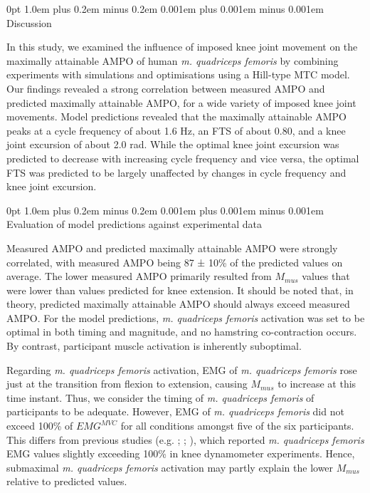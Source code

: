 \documentclass[
  11pt,
  a4paper]{article}
\makeatletter
\renewcommand{\section}{%
  \@startsection{section}{1}
    {0pt} 					%
    {1.0em plus 0.2em minus 0.2em} 	%
    {0.001em plus 0.001em minus 0.001em}    	%
    {\Large\bfseries\sffamily}%
}
\renewcommand{\subsection}{%
  \@startsection{subsection}{2}
    {0pt} 					%
    {1.0em plus 0.2em minus 0.2em} 	%
    {0.001em plus 0.001em minus 0.001em}    	%
    {\large\bfseries\sffamily}%
}
\makeatother
\begin{document}
\section{Discussion}\label{discussion}

In this study, we examined the influence of imposed knee joint movement
on the maximally attainable AMPO of human \emph{m. quadriceps femoris}
by combining experiments with simulations and optimisations using a
Hill-type MTC model. Our findings revealed a strong correlation between
measured AMPO and predicted maximally attainable AMPO, for a wide
variety of imposed knee joint movements. Model predictions revealed that
the maximally attainable AMPO peaks at a cycle frequency of about 1.6
Hz, an FTS of about 0.80, and a knee joint excursion of about 2.0 rad.
While the optimal knee joint excursion was predicted to decrease with
increasing cycle frequency and vice versa, the optimal FTS was predicted
to be largely unaffected by changes in cycle frequency and knee joint
excursion.

\subsection{Evaluation of model predictions against experimental
data}\label{evaluation-of-model-predictions-against-experimental-data}

Measured AMPO and predicted maximally attainable AMPO were strongly
correlated, with measured AMPO being 87 ± 10\% of the predicted values
on average. The lower measured AMPO primarily resulted from \(M_{mus}\)
values that were lower than values predicted for knee extension. It
should be noted that, in theory, predicted maximally attainable AMPO
should always exceed measured AMPO. For the model predictions, \emph{m.
quadriceps femoris} activation was set to be optimal in both timing and
magnitude, and no hamstring co-contraction occurs. By contrast,
participant muscle activation is inherently suboptimal.

Regarding \emph{m. quadriceps femoris} activation, EMG of \emph{m.
quadriceps femoris} rose just at the transition from flexion to
extension, causing \(M_{mus}\) to increase at this time instant. Thus,
we consider the timing of \emph{m. quadriceps femoris} of participants
to be adequate. However, EMG of \emph{m. quadriceps femoris} did not
exceed 100\% of \(EMG^{MVC}\) for all conditions amongst five of the six
participants. This differs from previous studies (e.g.
;
;
), which
reported \emph{m. quadriceps femoris} EMG values slightly exceeding
100\% in knee dynamometer experiments. Hence, submaximal \emph{m.
quadriceps femoris} activation may partly explain the lower \(M_{mus}\)
relative to predicted values.
\end{document}
